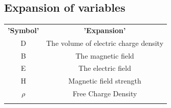 \subsection{Expansion of variables}



\large\centering\begin{tabular}{ c c }  

  \textbf{'Symbol'} & \textbf{'Expansion'}  \\
    
  D & The volume of electric charge density \\   
  B & The magnetic field \\    
  E & The electric field \\    
  H & Magnetic field strength \\  
  
  $\rho$ & Free Charge Density\\
  

\large\centering\end{tabular}




